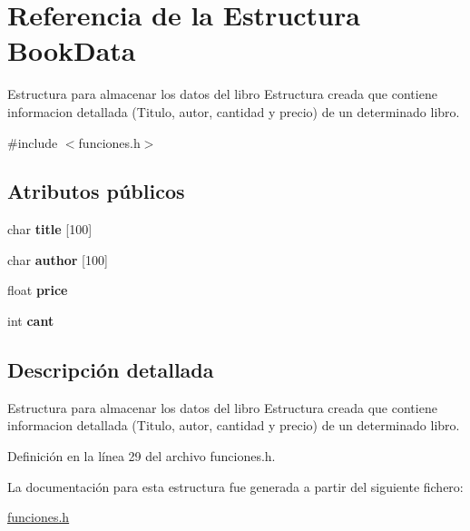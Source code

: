\hypertarget{struct_book_data}{}\section{Referencia de la Estructura Book\+Data}
\label{struct_book_data}


Estructura para almacenar los datos del libro Estructura creada que contiene informacion detallada (Titulo, autor, cantidad y precio) de un determinado libro.  




{\ttfamily \#include $<$funciones.\+h$>$}

\subsection*{Atributos públicos}
\begin{DoxyCompactItemize}
\item 
\mbox{\label{struct_book_data_a1368035870f4979b534999ce08edd421}} 
char {\bfseries title} \mbox{[}100\mbox{]}
\item 
\mbox{\label{struct_book_data_a302226e77f0c21173ab6fe0b9e2e64ee}} 
char {\bfseries author} \mbox{[}100\mbox{]}
\item 
\mbox{\label{struct_book_data_a585fea730f1c6b93bcc814f27663cc05}} 
float {\bfseries price}
\item 
\mbox{\label{struct_book_data_af14a8f80cca5ff48d90802f17a4ab03a}} 
int {\bfseries cant}
\end{DoxyCompactItemize}


\subsection{Descripción detallada}
Estructura para almacenar los datos del libro Estructura creada que contiene informacion detallada (Titulo, autor, cantidad y precio) de un determinado libro. 

Definición en la línea 29 del archivo funciones.\+h.



La documentación para esta estructura fue generada a partir del siguiente fichero\+:\begin{DoxyCompactItemize}
\item 
\mbox{\hyperlink{funciones_8h}{funciones.\+h}}\end{DoxyCompactItemize}
